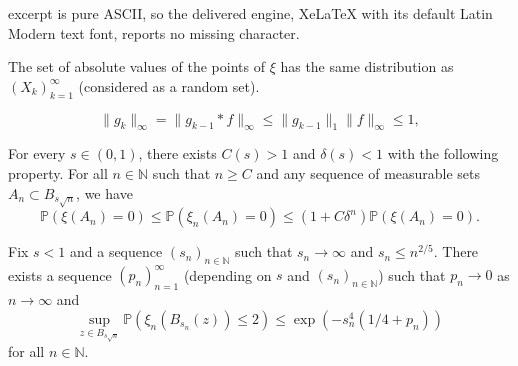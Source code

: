 \documentclass[10pt,a4paper]{amsart}
\def\P{\mathbb P}
\begin{document}
excerpt is pure ASCII, so the delivered engine, XeLaTeX with its default Latin Modern text font, reports no missing character.
\begin{lemma}\label{l:gincounting}
The set of absolute values of the points of $\xi$ has the same distribution as $( X_k)_{k=1}^{\infty}$ (considered as a random set).
\end{lemma}

\begin{equation}\label{e:gammadensitybound}
\| g_k \|_\infty = \| g_{k-1} \ast  f \|_\infty \le \| g_{k-1} \|_1 \| f \|_\infty \le 1,
\end{equation}

\begin{lemma} \label{lem:gininf}
	For every $s \in (0,1)$, there exists $C(s)>1$ and  $\delta(s) <1$ with the following property.  For all $n  \in \mathbb N$ such that $n \ge C$ and any sequence of measurable sets $A_n \subset B_{s \sqrt n}$, we have 
	$$
	\mathbb P(\xi(A_n)=0) \le  \mathbb P(\xi_n(A_n)=0) \le (1+C \delta^n) \mathbb P(\xi(A_n)=0).
	$$
\end{lemma}

\begin{lemma}\label{lem:mom2}
Fix  $s<1$ and a sequence $(s_n)_{n \in \mathbb N}$ such that $s_n \to \infty$ and $s_n \le n^{2/5}$. There exists a sequence $(p_n)_{n=1}^\infty$ (depending on $s$ and  $(s_n)_{n \in \mathbb N}$) such that $p_n \to 0$ as $n \to \infty$ and 
\[
\sup_{z \in B_{s \sqrt{n}} } \P ( \xi_n ( B_{s_n} (z)) \le 2 ) \le \exp(-s_n^4(1/4+p_n))
\]
for all $n \in \mathbb{N}$.
\end{lemma}
\end{document}
